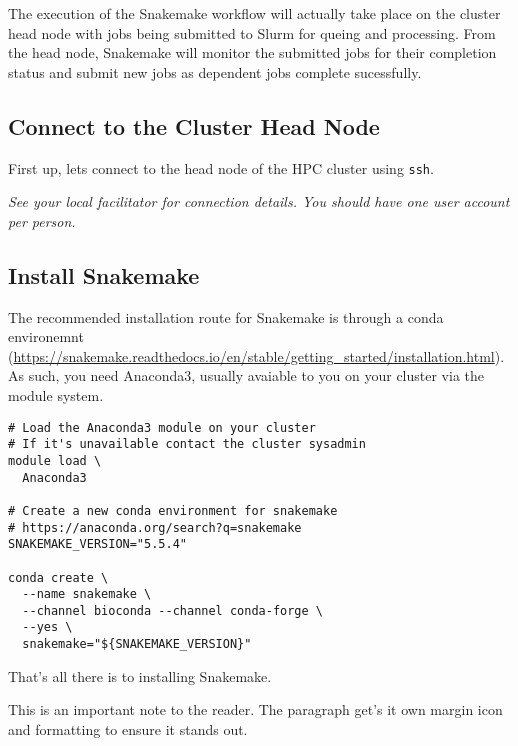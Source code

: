 The execution of the Snakemake workflow will actually take place on the cluster head node with jobs
being submitted to Slurm for queing and processing. From the head node, Snakemake will monitor the
submitted jobs for their completion status and submit new jobs as dependent jobs complete sucessfully.

\subsection{Connect to the Cluster Head Node}

\begin{steps}
First up, lets connect to the head node of the HPC cluster using \texttt{ssh}.

\emph{See your local facilitator for connection details. You should have one user account per person.}
\end{steps}

\subsection{Install Snakemake}

The recommended installation route for Snakemake is through a conda environemnt
(\url{https://snakemake.readthedocs.io/en/stable/getting_started/installation.html}). As such, you need
Anaconda3, usually avaiable to you on your cluster via the module system.

\begin{steps}
\begin{lstlisting}
# Load the Anaconda3 module on your cluster
# If it's unavailable contact the cluster sysadmin
module load \
  Anaconda3

# Create a new conda environment for snakemake
# https://anaconda.org/search?q=snakemake
SNAKEMAKE_VERSION="5.5.4"

conda create \
  --name snakemake \
  --channel bioconda --channel conda-forge \
  --yes \
  snakemake="${SNAKEMAKE_VERSION}"
\end{lstlisting}

That's all there is to installing Snakemake.
\end{steps}








\begin{note}
This is an important note to the reader. The paragraph get's it own margin icon and formatting to
ensure it stands out.
\end{note}

